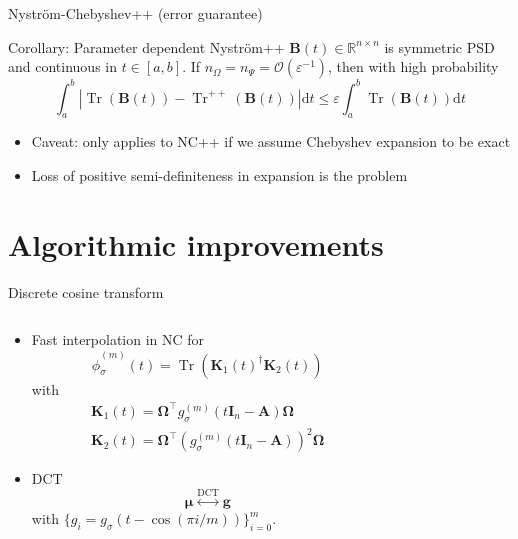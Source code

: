 \documentclass[aspectratio=169, 12pt]{beamer}
\newcommand{\mtx}[1]{\boldsymbol{#1}}
\newcommand{\vct}[1]{\boldsymbol{#1}}
\DeclareMathOperator{\Tr}{Tr}
\DeclareMathOperator{\DCT}{DCT}
\begin{document}
\begin{frame}{Nystr\"om-Chebyshev++ (error guarantee)}
    \begin{block}{Corollary: Parameter dependent Nystr\"om++}
        $\mtx{B}(t) \in \mathbb{R}^{n \times n}$ is symmetric \gls{PSD}
        and continuous in $t \in [a, b]$. If $n_{\Omega} = n_{\Psi} = \mathcal{O}\left( \varepsilon^{-1} \right)$,
        then with high probability
        \begin{equation}
            \int_{a}^{b} |\Tr(\mtx{B}(t)) - \Tr^{++}(\mtx{B}(t))| \mathrm{d}t \leq \varepsilon \int_{a}^{b}\Tr(\mtx{B}(t)) \mathrm{d}t
        \end{equation}
    \end{block}
    \begin{itemize}
        \item Caveat: only applies to NC++ if we assume Chebyshev expansion to be exact
        \item Loss of positive semi-definiteness in expansion is the problem
    \end{itemize}
\end{frame}

\section{Algorithmic improvements}

\begin{frame}{Discrete cosine transform}
    \begin{columns}
        \begin{column}{0.55\textwidth}
            \begin{itemize}
                \item Fast interpolation in \gls{NC} for
                \begin{equation}
                    \widehat{\phi}_{\sigma}^{(m)}(t) = \Tr(\mtx{K}_1(t)^{\dagger} \mtx{K}_2(t))
                \end{equation}
                with
                \begin{align}
                    \mtx{K}_1(t) = \mtx{\Omega}^{\top} g_{\sigma}^{(m)}(t\mtx{I}_n - \mtx{A}) \mtx{\Omega} \\
                    \mtx{K}_2(t) = \mtx{\Omega}^{\top} (g_{\sigma}^{(m)}(t\mtx{I}_n - \mtx{A}))^2 \mtx{\Omega}
                \end{align}
                \item \Gls{DCT}
                \begin{equation}
                    \vct{\mu} \stackrel{\DCT}{\longleftrightarrow} \vct{g}
                \end{equation}
                with $\{g_i = g_{\sigma}(t - \cos(\pi i / m))\}_{i=0}^m$.
            \end{itemize}
        \end{column}
        \begin{column}{0.45\textwidth}
            \scalebox{0.65}{}
        \end{column}
    \end{columns}
\end{frame}
\end{document}
